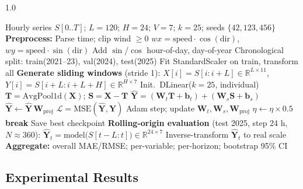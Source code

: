\begin{spacing}{1.0}
\begin{algorithm}[H]
\small
\caption{DLinear training and rolling-origin evaluation}
\label{alg:dlinear}
\begin{algorithmic}[1]
\Require Hourly series $S[0..T]$; $L=120$; $H=24$; $V=7$; $k=25$;
         seeds $\{42,123,456\}$
\State \textbf{Preprocess:}
\State \quad Parse time; clip wind $\ge 0$
\State \quad $wx = \text{speed}\cdot\cos(\text{dir})$,\;
        $wy = \text{speed}\cdot\sin(\text{dir})$
\State \quad Add $\sin$/$\cos$ hour-of-day, day-of-year
\State \quad Chronological split: train(2021--23), val(2024), test(2025)
\State \quad Fit StandardScaler on train, transform all
\State \textbf{Generate sliding windows} (stride 1):
\State \quad $X[i] = S[i:i+L] \in \mathbb{R}^{L \times 11}$,\;
        $Y[i] = S[i+L:i+L+H] \in \mathbb{R}^{H \times 7}$
  \State Init.\ DLinear($k=25$, individual)
    \State $\mathbf{T} = \text{AvgPool1d}(\mathbf{X})$;\;
          $\mathbf{S} = \mathbf{X} - \mathbf{T}$
    \State $\mathbf{\hat{Y}} = (\mathbf{W}_t\mathbf{T} + \mathbf{b}_t)
           + (\mathbf{W}_s\mathbf{S} + \mathbf{b}_s)$
    \State $\mathbf{\hat{Y}} \gets \mathbf{\hat{Y}}\,\mathbf{W}_{\text{proj}}$
    \State $\mathcal{L} = \text{MSE}(\mathbf{\hat{Y}}, \mathbf{Y})$
    \State Adam step; update $\mathbf{W}_t,\mathbf{W}_s,\mathbf{W}_{\text{proj}}$
     \State $\eta \gets \eta \times 0.5$ \EndIf
     \State \textbf{break} \EndIf
  \EndFor
  \State Save best checkpoint
\EndFor
\State \textbf{Rolling-origin evaluation} (test 2025, step 24 h, $N\approx 360$):
  \State $\mathbf{\hat{Y}}_t = \text{model}\big(S[t-L:t]\big)
         \in \mathbb{R}^{24 \times 7}$
  \State Inverse-transform $\mathbf{\hat{Y}}_t$ to real scale
\EndFor
\State \textbf{Aggregate:} overall MAE/RMSE; per-variable; per-horizon;
       bootstrap 95\% CI
\end{algorithmic}
\end{algorithm}
\end{spacing}

\subsection{Experimental Results}

